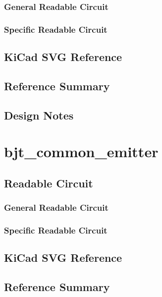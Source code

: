 \documentclass[11pt]{article}
\begin{document}
\subsubsection{General Readable Circuit}

\subsubsection{Specific Readable Circuit}

\subsection{KiCad SVG Reference}
\subsection{Reference Summary}

\subsection{Design Notes}

\clearpage
\section{bjt\_common\_emitter}
\subsection{Readable Circuit}
\subsubsection{General Readable Circuit}

\subsubsection{Specific Readable Circuit}

\subsection{KiCad SVG Reference}
\subsection{Reference Summary}

\end{document}
